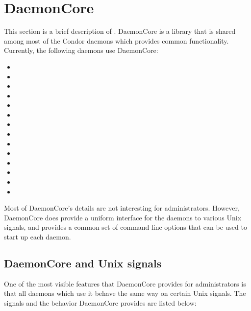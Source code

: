 
\section{\label{sec:DaemonCore}DaemonCore}

This section is a brief description of .  DaemonCore
is a library that is shared among most of the Condor daemons which
provides common functionality.  Currently, the following daemons use
DaemonCore:

\begin{itemize}
\item {}
\item {}
\item {}
\item {}
\item {}
\item {}
\item {}
\item {}
\item {}
\item {}
\item {}
\item {}
\item {}
\item {}
\end{itemize}

Most of DaemonCore's details are not interesting for administrators.
However, DaemonCore does provide a uniform interface for the daemons
to various Unix signals, and provides a common set of command-line
options that can be used to start up each daemon.

\subsection{\label{sec:DaemonCore-Signals}DaemonCore and Unix signals}

One of the most visible features that DaemonCore provides for
administrators is that all daemons which use it behave the same way on
certain Unix signals.  The signals and the behavior DaemonCore
provides are listed below:

